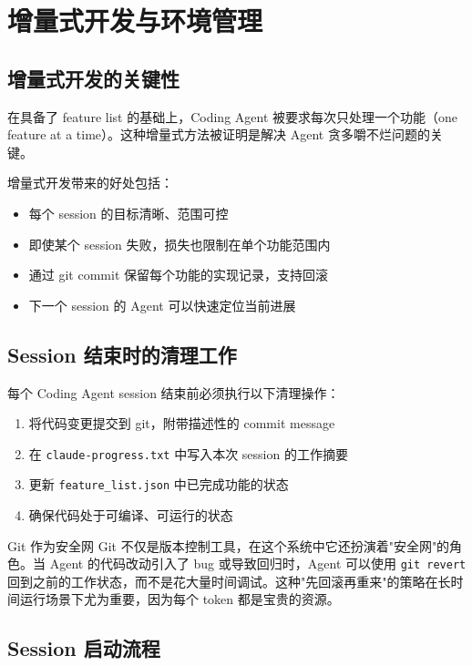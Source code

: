 \section{增量式开发与环境管理}

\subsection{增量式开发的关键性}

在具备了 feature list 的基础上，Coding Agent 被要求每次只处理一个功能（one feature at a time）。这种增量式方法被证明是解决 Agent 贪多嚼不烂问题的关键。

增量式开发带来的好处包括：
\begin{itemize}
    \item 每个 session 的目标清晰、范围可控
    \item 即使某个 session 失败，损失也限制在单个功能范围内
    \item 通过 git commit 保留每个功能的实现记录，支持回滚
    \item 下一个 session 的 Agent 可以快速定位当前进展
\end{itemize}

\subsection{Session 结束时的清理工作}

每个 Coding Agent session 结束前必须执行以下清理操作：

\begin{enumerate}
    \item 将代码变更提交到 git，附带描述性的 commit message
    \item 在 \texttt{claude-progress.txt} 中写入本次 session 的工作摘要
    \item 更新 \texttt{feature\_list.json} 中已完成功能的状态
    \item 确保代码处于可编译、可运行的状态
\end{enumerate}

\begin{knowledgebox}{Git 作为安全网}
Git 不仅是版本控制工具，在这个系统中它还扮演着"安全网"的角色。当 Agent 的代码改动引入了 bug 或导致回归时，Agent 可以使用 \texttt{git revert} 回到之前的工作状态，而不是花大量时间调试。这种"先回滚再重来"的策略在长时间运行场景下尤为重要，因为每个 token 都是宝贵的资源。
\end{knowledgebox}

\subsection{Session 启动流程}

